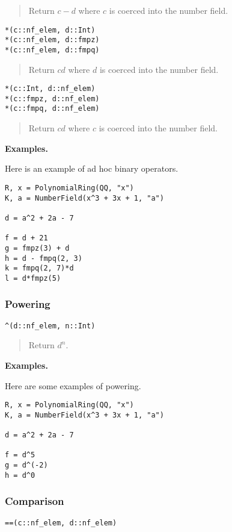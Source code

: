 \documentclass[a4paper,10pt]{article}
\newcommand{\desc}[1]{\vspace{-3mm}\begin{quote}#1\end{quote}}
\begin{document}
{{\desc{Return $c - d$ where $c$ is coerced into the number field.}

\begin{lstlisting}
*(c::nf_elem, d::Int)
*(c::nf_elem, d::fmpz)
*(c::nf_elem, d::fmpq)
\end{lstlisting}

\desc{Return $cd$ where $d$ is coerced into the number field.}

\begin{lstlisting}
*(c::Int, d::nf_elem)
*(c::fmpz, d::nf_elem)
*(c::fmpq, d::nf_elem)
\end{lstlisting}

\desc{Return $cd$ where $c$ is coerced into the number field.}

\textbf{Examples.}

Here is an example of ad hoc binary operators.

\begin{lstlisting}
R, x = PolynomialRing(QQ, "x")
K, a = NumberField(x^3 + 3x + 1, "a")

d = a^2 + 2a - 7

f = d + 21
g = fmpz(3) + d
h = d - fmpq(2, 3)
k = fmpq(2, 7)*d
l = d*fmpz(5)
\end{lstlisting}

\subsubsection{Powering}

\begin{lstlisting}
^(d::nf_elem, n::Int)
\end{lstlisting}

\desc{Return $d^n$.}

\textbf{Examples.}

Here are some examples of powering.

\begin{lstlisting}
R, x = PolynomialRing(QQ, "x")
K, a = NumberField(x^3 + 3x + 1, "a")

d = a^2 + 2a - 7

f = d^5
g = d^(-2)
h = d^0
\end{lstlisting}

\subsubsection{Comparison}

\begin{lstlisting}
==(c::nf_elem, d::nf_elem)
\end{lstlisting}

}}
\end{document}
